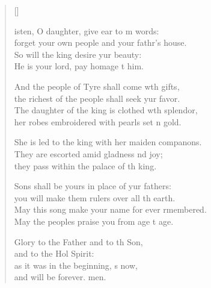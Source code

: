 \settowidth{\versewidth}{The daughter of the king is clothed with splendor, *}
\begin{verse}[\versewidth]
  \begin{patverse}
isten, O daughter, give ear to m words:\Med\\
forget your own people and your fathr’s house.\\
So will the king desire yur beauty:\Med\\
He is your lord, pay homage t him.

And the people of Tyre shall come w\pointup{\i}th gifts,\Med\\
the richest of the people shall seek yur favor.\\
The daughter of the king is clothed w\pointup{\i}th splendor,\Med\\
her robes embroidered with pearls set \pointup{\i}n gold.

She is led to the king with her maiden compan\pointup{\i}ons.\Flex\\
They are escorted amid gladness nd joy;\Med\\
they pass within the palace of th king.

Sons shall be yours in place of yur fathers:\Med\\
you will make them rulers over all th earth.\\
May this song make your name for ever rmembered.\Med\\
May the peoples praise you from age t age.

Glory to the Father and to th Son,\Med\\
and to the Hol Spirit:\\
as it was in the beginning, \pointup{\i}s now,\Med\\
and will be forever. men. 
  \end{patverse}
\end{verse}
